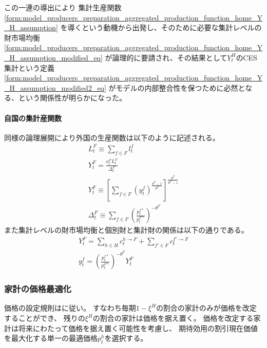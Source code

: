 この一連の導出により
集計生産関数
\eqref{form:model_producers_preparation_aggregated_production_function_home_Y_H_assumption}
を導くという動機から出発し、そのために必要な集計レベルの財市場均衡
\eqref{form:model_producers_preparation_aggregated_production_function_home_Y_H_assumption_modified_eq}
が論理的に要請され、その結果として\(Y_t^H\)のCES集計という定義
\eqref{form:model_producers_preparation_aggregated_production_function_home_Y_H_assumption_modified2_eq}
がモデルの内部整合性を保つために必然となる、という関係性が明らかになった。

\paragraph{自国の集計産関数}
\label{sec:model_producers_preparation_aggregated_production_function_foreign}
同様の論理展開により外国の生産関数は以下のように記述される。
\begin{gather}
    \label{form:model_producers_preparation_aggregated_production_function_foreign_L_F_def}
        L_t^F\equiv\sum_{f\in F}l_t^f \\
    \label{form:model_producers_preparation_aggregated_production_function_foreign_Y_F_assumption_eq}
        Y_t^F=\frac{a_t^FL_t^F}{\Delta_t^F} \\
    \label{form:model_producers_preparation_aggregated_production_function_foreign_Y_F_assumption_modified_eq}
        Y_t^F\equiv\left[\sum_{f\in F}(y_t^f)^{\frac{\theta^F-1}{\theta^F}}\right]^{\frac{\theta^F}{\theta^F-1}} \\
    \label{form:model_producers_preparation_aggregated_production_function_foreign_step2_Delta_F_def}
        \Delta_t^F\equiv\sum_{f\in F}\left(\frac{p_t^{f*}}{p_t^{F*}}\right)^{-\theta^F}
\end{gather}また集計レベルの財市場均衡と個別財と集計財の関係は以下の通りである。
\begin{gather}
    \label{form:model_producers_preparation_aggregated_production_function_foreign_Y_F_assumption_modified2_eq}
        Y_t^F=\sum_{h\in H}c_t^{h\to F}+\sum_{f'\in F}c_t^{f'\to F} \\
    \label{form:model_producers_preparation_aggregated_production_function_foreign_Y_F_assumption_y_h_eq}
        y_t^f=\left(\frac{p_t^{f*}}{p_t^{F*}}\right)^{-\theta^F}Y_t^F
\end{gather}

\subsubsection{家計の価格最適化}
\label{sec:model_producers_optimization}
価格の設定規則は\textcite{Calvo1983}に従い。
すなわち毎期\(1-\xi^H\)の割合の家計のみが価格を改定することができ、
残りの\(\xi^H\)の割合の家計は価格を据え置く。
価格を改定する家計は将来にわたって価格を据え置く可能性を考慮し、
期待効用の割引現在価値を最大化する単一の最適価格\(p_t^h\)を選択する。

